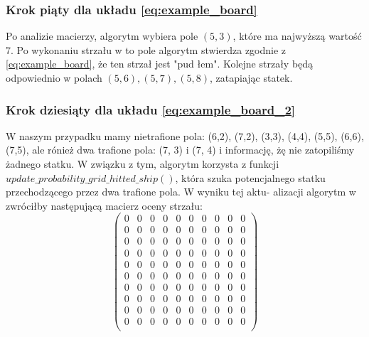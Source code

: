 \documentclass[magisterska]{pracadypl}
\begin{document}
\subsubsection{Krok piąty dla układu \eqref{eq:example_board}}

Po analizie macierzy, algorytm wybiera pole $(5,3)$, które ma najwyższą wartość 7. Po wykonaniu strzału w to pole algorytm stwierdza zgodnie z \eqref{eq:example_board}, że ten strzał jest "pud  łem". Kolejne strzały będą odpowiednio w polach $(5,6), (5,7), (5,8)$, zatapiając statek.
\subsubsection{Krok dziesiąty dla układu \eqref{eq:example_board_2}}
W naszym przypadku mamy nietrafione pola: (6,2), (7,2), (3,3), (4,4), (5,5), (6,6), (7,5), ale rónież dwa trafione pola: (7, 3) i (7, 4) i informację, żę nie zatopiliśmy żadnego statku. W związku z tym, algorytm korzysta z funkcji $update\_probability\_grid\_hitted\_ship()$,
która szuka potencjalnego statku przechodzącego przez dwa trafione pola. W wyniku tej aktu-
alizacji algorytm w zwróciłby następującą macierz oceny strzału:
$$
\begin{pmatrix}
0 & 0 & 0 & 0 & 0 & 0 & 0 & 0 & 0 & 0 \\
0 & 0 & 0 & 0 & 0 & 0 & 0 & 0 & 0 & 0 \\
0 & 0 & 0 & 0 & 0 & 0 & 0 & 0 & 0 & 0 \\
0 & 0 & 0 & 0 & 0 & 0 & 0 & 0 & 0 & 0 \\
0 & 0 & 0 & 0 & 0 & 0 & 0 & 0 & 0 & 0 \\
0 & 0 & 0 & 0 & 0 & 0 & 0 & 0 & 0 & 0 \\
0 & 0 & 0 & 0 & 0 & 0 & 0 & 0 & 0 & 0 \\
0 & 0 & 0 & 0 & 0 & 0 & 0 & 0 & 0 & 0 \\
0 & 0 & 0 & 0 & 0 & 0 & 0 & 0 & 0 & 0 \\
0 & 0 & 0 & 0 & 0 & 0 & 0 & 0 & 0 & 0 \\
\end{pmatrix}
$$
\end{document}
